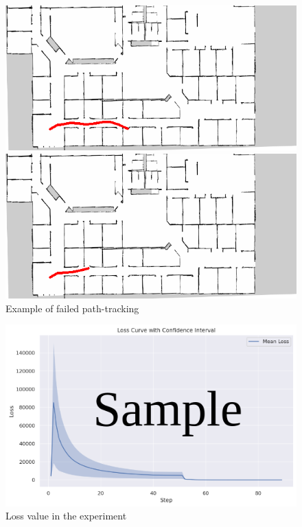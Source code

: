 \begin{figure}[h]
  \begin{minipage}[b]{0.45\linewidth}
    \centering
    \includegraphics[keepaspectratio, scale=0.35]{images/694_520_0128/traject9.png}
    \subcaption{}
  \end{minipage}
  \begin{minipage}[b]{0.45\linewidth}
    \centering
    \includegraphics[keepaspectratio, scale=0.35]{images/694_520_0128/traject22.png}
    \subcaption{}
  \end{minipage}
\caption{Example of failed path-tracking}
\label{Fig:fail}
\end{figure}

\newpage
\begin{figure}[h]
  \centering
  \includegraphics[keepaspectratio, scale=0.6]{images/sample.png}
  \caption{Loss value in the experiment}
  \label{Fig:sample}
\end{figure}

